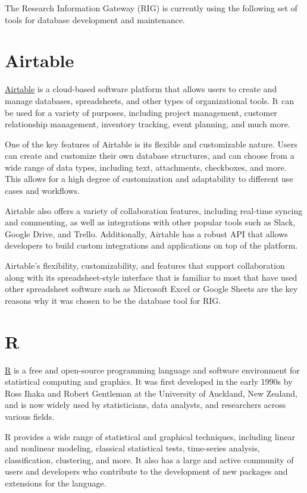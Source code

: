 \documentclass[
]{book}
\begin{document}
The Research Information Gateway (RIG) is currently using the following set of tools for database development and maintenance.

\hypertarget{airtable}{%
\section{Airtable}\label{airtable}}

\href{https://airtable.com}{Airtable} is a cloud-based software platform that allows users to create and manage databases, spreadsheets, and other types of organizational tools. It can be used for a variety of purposes, including project management, customer relationship management, inventory tracking, event planning, and much more.

One of the key features of Airtable is its flexible and customizable nature. Users can create and customize their own database structures, and can choose from a wide range of data types, including text, attachments, checkboxes, and more. This allows for a high degree of customization and adaptability to different use cases and workflows.

Airtable also offers a variety of collaboration features, including real-time syncing and commenting, as well as integrations with other popular tools such as Slack, Google Drive, and Trello. Additionally, Airtable has a robust API that allows developers to build custom integrations and applications on top of the platform.

Airtable's flexibility, customizability, and features that support collaboration along with its spreadsheet-style interface that is familiar to most that have used other spreadsheet software such as Microsoft Excel or Google Sheets are the key reasons why it was chosen to be the database tool for RIG.

\hypertarget{r}{%
\section{R}\label{r}}

\href{https://cran.r-project.org}{R} is a free and open-source programming language and software environment for statistical computing and graphics. It was first developed in the early 1990s by Ross Ihaka and Robert Gentleman at the University of Auckland, New Zealand, and is now widely used by statisticians, data analysts, and researchers across various fields.

R provides a wide range of statistical and graphical techniques, including linear and nonlinear modeling, classical statistical tests, time-series analysis, classification, clustering, and more. It also has a large and active community of users and developers who contribute to the development of new packages and extensions for the language.
\end{document}
